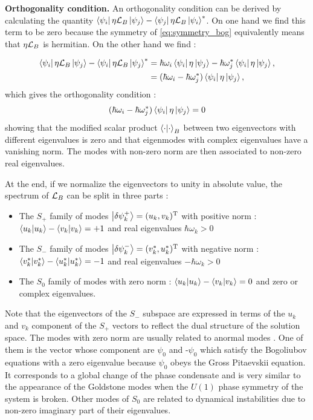 \textbf{Orthogonality condition.} An orthogonality condition can be derived by calculating the quantity $\bra{\psi_i}\eta\mathcal{L}_B\ket{\psi_j}-\bra{\psi_j}\eta\mathcal{L}_B\ket{\psi_i}^*$. On one hand we find this term to be zero because 
the symmetry of \autoref{eq:symmetry_bog} equivalently means that $\eta\mathcal{L}_B$ is hermitian. On the other hand we find :

\begin{equation}
    \begin{align}
    \bra{\psi_i}\eta\mathcal{L}_B\ket{\psi_j}-\bra{\psi_i}\eta\mathcal{L}_B\ket{\psi_j}^*&=\hbar\omega_i\bra{\psi_i}\eta\ket{\psi_j}-\hbar\omega_j^*\bra{\psi_i}\eta\ket{\psi_j}, \\
    &=(\hbar\omega_i-\hbar\omega_j^*)\bra{\psi_i}\eta\ket{\psi_j},
    \end{align}
\end{equation}
which gives the orthogonality condition :
\begin{equation}
    (\hbar\omega_i-\hbar\omega_j^*)\bra{\psi_i}\eta\ket{\psi_j}=0
\end{equation}
showing that the modified scalar product $\bra{\cdot}\ket{\cdot}_B$ between two eigenvectors with different eigenvalues is zero and that 
eigenmodes with complex eigenvalues have a vanishing norm. The modes with non-zero norm are then associated to non-zero real eigenvalues.


At the end, if we normalize the eigenvectors to unity in absolute value, the spectrum of $\mathcal{L}_B$ can be split in three parts :

\begin{itemize}
    \item The $S_+$ family of modes $\ket{\delta\psi^+_k}=(u_k,v_k)^\mathrm{T}$ with positive norm : $\bra{u_k}\ket{u_k} - \bra{v_k}\ket{v_k}=+1$ and real eigenvalues $\hbar\omega_k>0$
    \item The $S_-$ family of modes $\ket{\delta\psi^-_k}=(v^*_k,u^*_k)^\mathrm{T}$ with negative norm : $\bra{v^*_k}\ket{v^*_k} - \bra{u^*_k}\ket{u^*_k}=-1$ and real eigenvalues $-\hbar\omega_k>0$
    \item The $S_0$ family of modes with zero norm : $\bra{u_k}\ket{u_k} - \bra{v_k}\ket{v_k}=0$ and zero or complex eigenvalues.
\end{itemize}
Note that the eigenvectors of the $S_-$ subspace are expressed in terms of the $u_k$ and $v_k$ component of the $S_+$ vectors to reflect the dual structure of the solution space. The modes with zero norm are usually related to anormal modes \cite{castin_bose-einstein_2001}. One of them is the vector whose component are $\psi_0$ and -$\psi_0$ which satisfy the Bogoliubov equations with a zero eigenvalue because 
$\psi_0$ obeys the Gross Pitaevskii equation. It corresponds to a global change of the phase condensate and is very similar to the appearance of the Goldstone modes when the $U(1)$ phase symmetry of the system is broken. Other modes of $S_0$ are related to dynamical instabilities 
due to non-zero imaginary part of their eigenvalues.

